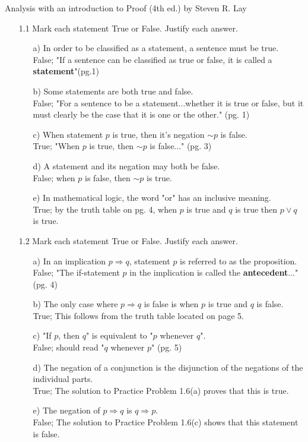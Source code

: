 \documentclass[12pt]{article}
\begin{document}
Analysis with an introduction to Proof (4th ed.) by Steven R. Lay
\begin{enumerate}

\item[1.1] Mark each statement True or False. Justify each answer.
\begin{enumerate}
\item[a)] In order to be classified as a statement, a sentence must be true.\\
False; "If a sentence can be classified as true or false, it is called a {\bf statement}"(pg.1)
\item[b)] Some statements are both true and false.\\
False; "For a sentence to be a statement...whether it is true or false, but it must clearly be the case that it is one or the other." (pg. 1)
\item[c)] When statement $p$ is true, then it's negation $\sim$$p$ is false. \\
True; "When $p$ is true, then $\sim$$p$ is false..." (pg. 3)
\item[d)] A statement and its negation may both be false.\\
False; when $p$ is false, then $\sim$$p$ is true.
\item[e)] In mathematical logic, the word "or" has an inclusive meaning.\\
True; by the truth table on pg. 4, when $p$ is true and $q$ is true then $p \vee q$ is true.
\end{enumerate}

\item[1.2] Mark each statement True or False. Justify each answer.
\begin{enumerate}
\item[a)] In an implication $p \Rightarrow q$, statement $p$ is referred to as the proposition.\\
False; "The if-statement $p$ in the implication is called the {\bf antecedent}..."(pg. 4)
\item[b)] The only case where $p \Rightarrow q$ is false is when $p$ is true and $q$ is false.\\
True; This follows from the truth table located on page 5.
\item[c)] "If $p$, then $q$" is equivalent to "$p$ whenever $q$".\\
False; should read "$q$ whenever $p$" (pg. 5)
\item[d)] The negation of a conjunction is the disjunction of the negations of the individual parts.\\
True; The solution to Practice Problem 1.6(a) proves that this is true.
\item[e)] The negation of $p \Rightarrow q$ is $q \Rightarrow p$.\\
False; The solution to Practice Problem 1.6(c) shows that this statement is false.
\end{enumerate}


\end{enumerate}
\end{document}
